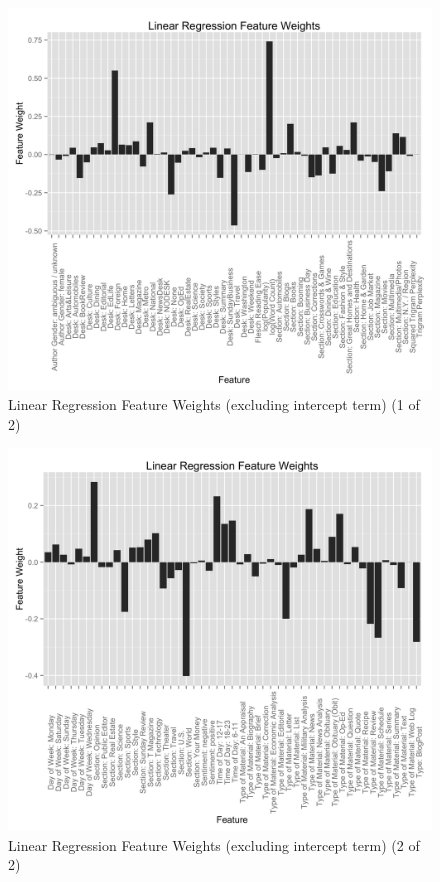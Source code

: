 \documentclass[fleqn,12pt]{SelfArx} %
\begin{document}
\begin{figure}[ht]\centering
\includegraphics[width=\linewidth]{feature_weights.png}
\caption{Linear Regression Feature Weights (excluding intercept term) (1 of 2)}
\label{fig:lin_reg_weights1}
\end{figure}

\begin{figure}[ht]\centering
\includegraphics[width=\linewidth]{feature_weights_contd.png}
\caption{Linear Regression Feature Weights (excluding intercept term) (2 of 2)}
\label{fig:lin_reg_weights2}
\end{figure}
\end{document}
